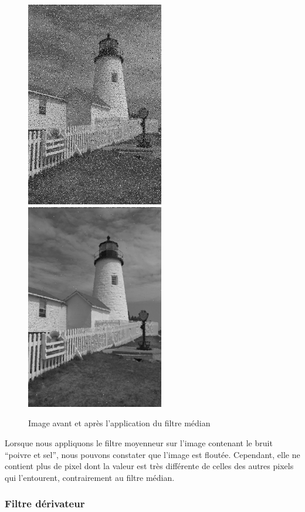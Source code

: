 \begin{figure}[H]
      \center
      \includegraphics[width=6cm]{ressources/tp4/phare_bruit_ps.png}
      \includegraphics[width=6cm]{ressources/tp4/phare_dest_median.png}
      \caption{Image avant et après l'application du filtre médian}
\end{figure}

Lorsque nous appliquons le filtre moyenneur sur l'image contenant le bruit ``poivre et sel'', nous pouvons constater que l'image
est floutée. Cependant, elle ne contient plus de pixel dont la valeur est très différente de celles des autres pixels qui l'entourent,
contrairement au filtre médian.\\

\subsubsection{Filtre dérivateur}

